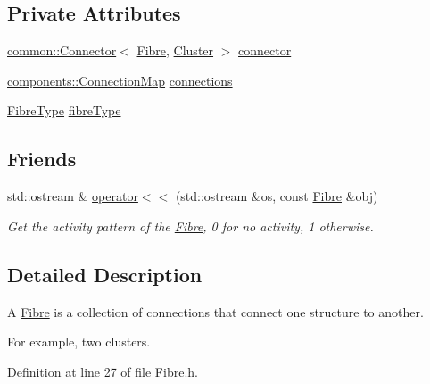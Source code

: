 \subsection*{\-Private \-Attributes}
\begin{DoxyCompactItemize}
\item 
\hyperlink{classcryomesh_1_1common_1_1Connector}{common\-::\-Connector}$<$ \hyperlink{classcryomesh_1_1structures_1_1Fibre}{\-Fibre}, \hyperlink{classcryomesh_1_1structures_1_1Cluster}{\-Cluster} $>$ \hyperlink{classcryomesh_1_1structures_1_1Fibre_a13214170b78c57278f800c82f2a063f7}{connector}
\item 
\hyperlink{classcryomesh_1_1components_1_1ConnectionMap}{components\-::\-Connection\-Map} \hyperlink{classcryomesh_1_1structures_1_1Fibre_ac6b2267d1a4b1532345988eb29e55850}{connections}
\item 
\hyperlink{classcryomesh_1_1structures_1_1Fibre_aecbba6d46a76f888b3722491b674f5e4}{\-Fibre\-Type} \hyperlink{classcryomesh_1_1structures_1_1Fibre_acfd2fc68d27c91742e0319b2a0db090a}{fibre\-Type}
\end{DoxyCompactItemize}
\subsection*{\-Friends}
\begin{DoxyCompactItemize}
\item 
std\-::ostream \& \hyperlink{classcryomesh_1_1structures_1_1Fibre_a7dca0c0b433cc87d41580076ca31a419}{operator$<$$<$} (std\-::ostream \&os, const \hyperlink{classcryomesh_1_1structures_1_1Fibre}{\-Fibre} \&obj)
\begin{DoxyCompactList}\small\item\em \-Get the activity pattern of the \hyperlink{classcryomesh_1_1structures_1_1Fibre}{\-Fibre}, 0 for no activity, 1 otherwise. \end{DoxyCompactList}\end{DoxyCompactItemize}


\subsection{\-Detailed \-Description}
\-A \hyperlink{classcryomesh_1_1structures_1_1Fibre}{\-Fibre} is a collection of connections that connect one structure to another. 

\-For example, two clusters. 

\-Definition at line 27 of file \-Fibre.\-h.



